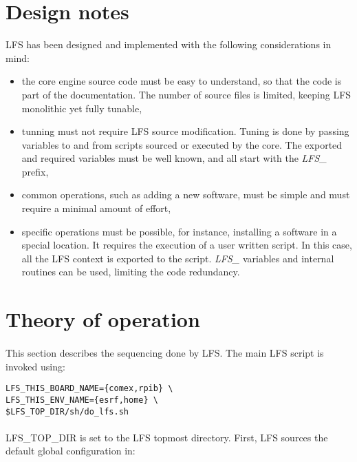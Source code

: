 \documentclass[a4paper, 11pt]{article}
\begin{document}
\section{Design notes}
LFS has been designed and implemented with the following considerations in mind:
\begin{itemize}
\item the core engine source code must be easy to understand, so that the code
is part of the documentation. The number of source files is limited, keeping LFS
monolithic yet fully tunable,
\item tunning must not require LFS source modification. Tuning is done by passing
variables to and from scripts sourced or executed by the core. The exported and
required variables must be well known, and all start with the \textit{LFS\_}
prefix,
\item common operations, such as adding a new software, must be simple and must
require a minimal amount of effort,
\item specific operations must be possible, for instance, installing a software
in a special location. It requires the execution of a user written script. In
this case, all the LFS context is exported to the script. \textit{LFS\_} variables
and internal routines can be used, limiting the code redundancy.
\end{itemize}


\clearpage
\section{Theory of operation}

\paragraph{}
This section describes the sequencing done by LFS. The main LFS script is invoked
using:\\

\begin{lstlisting}[frame=tb]
LFS_THIS_BOARD_NAME={comex,rpib} \
LFS_THIS_ENV_NAME={esrf,home} \
$LFS_TOP_DIR/sh/do_lfs.sh
\end{lstlisting}

\paragraph{}
LFS\_TOP\_DIR is set to the LFS topmost directory. First, LFS sources the default
global configuration in:\\
\end{document}
